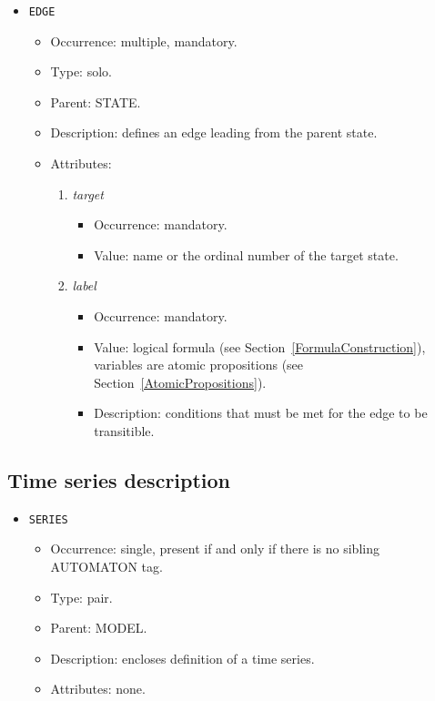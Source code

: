 \documentclass[12pt]{article}
\newenvironment{menum}{
\begin{enumerate}
  \setlength{\itemsep}{0pt}
  \setlength{\parskip}{0pt}
  \setlength{\parsep}{0pt}
}{\end{enumerate}}
\newenvironment{mitem}{
\begin{itemize}
  \setlength{\itemsep}{0pt}
  \setlength{\parskip}{0pt}
  \setlength{\parsep}{0pt}
}{\end{itemize}}
\begin{document}
\begin{mitem}
	\item \texttt{EDGE}
	\begin{mitem}
		\item Occurrence: multiple, mandatory.
		\item Type: solo.
		\item Parent: STATE.
		\item Description: defines an edge leading from the parent state.
		\item Attributes: 
		\begin{menum}
			\item \textit{target} 
			\begin{mitem}
				\item Occurrence: mandatory.
				\item Value: name or the ordinal number of the target state.
			\end{mitem}
			\item \textit{label} 
			\begin{mitem}
				\item Occurrence: mandatory.
				\item Value: logical formula (see Section~\ref{FormulaConstruction}), variables are atomic propositions (see Section~\ref{AtomicPropositions}).
				\item Description: conditions that must be met for the edge to be transitible.
			\end{mitem}
		\end{menum}
	\end{mitem}			
\end{mitem}		

\subsection{Time series description}
\begin{mitem}
	\item \texttt{SERIES}
	\begin{mitem}
		\item Occurrence: single,  present if and only if there is no sibling AUTOMATON tag.
		\item Type: pair.
		\item Parent: MODEL.
		\item Description: encloses definition of a time series.
		\item Attributes: none.
	\end{mitem}
\end{mitem}				
	
\end{document}
